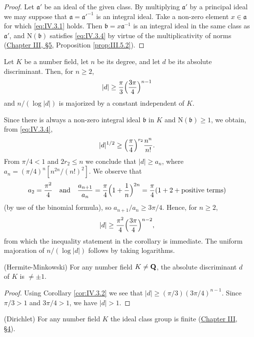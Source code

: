 \begin{proof}
Let $\mathfrak{a}'$ be an ideal of the given class. By multiplying
$\mathfrak{a}'$ by a principal ideal we may suppose that
$\mathfrak{a}=\mathfrak{a}'^{-1}$ is an integral ideal. Take a non-zero
element $x\in\mathfrak{a}$ for which \eqref{eq:IV.3.1} holds. Then
$\mathfrak{b}=x\mathfrak{a}^{-1}$ is an integral ideal in the same class as
$\mathfrak{a}'$, and $\mathrm{N}(\mathfrak{b})$ satisfies \eqref{eq:IV.3.4} by virtue
of the multiplicativity of norms (\hyperref[sec:3.5]{Chapter III, §5}, Proposition
\ref{prop:III.5.2}).
\end{proof}

\begin{corollary}
\label{cor:IV.3.2}
Let $K$ be a number field, let $n$ be its degree, and let $d$ be its
absolute discriminant. Then, for $n\geq2$,
\[
|d|\geq\frac{\pi}{3}\Bigl(\frac{3\pi}{4}\Bigr)^{n-1}
\]
and $n/(\log|d|)$ is majorized by a constant independent of $K$.
\end{corollary}

Since there is always a non-zero integral ideal $\mathfrak{b}$ in $K$ and
$\mathrm{N}(\mathfrak{b})\geq1$, we obtain, from \eqref{eq:IV.3.4},
\[
|d|^{1/2}\geq\Bigl(\frac{\pi}{4}\Bigr)^{r_{2}}\frac{n^{n}}{n!}.
\]
From $\pi/4<1$ and $2r_{2}\leq n$ we conclude that $|d|\geq a_{n}$, where
$a_{n}=(\pi/4)^{n}[n^{2n}/(n!)^{2}]$. We observe that
\[
a_{2}=\frac{\pi^{2}}{4}\quad\text{and}\quad
\frac{a_{n+1}}{a_{n}}=\frac{\pi}{4}\Bigl(1+\frac{1}{n}\Bigr)^{2n}
=\frac{\pi}{4}(1+2+\text{positive terms})
\]
(by use of the binomial formula), so $a_{n+1}/a_{n}\geq3\pi/4$. Hence, for
$n\geq2$,
\[
|d|\geq\frac{\pi^{2}}{4}\Bigl(\frac{3\pi}{4}\Bigr)^{n-2},
\]
from which the inequality statement in the corollary is immediate. The
uniform majoration of $n/(\log|d|)$ follows by taking logarithms.

\begin{theorem}
\label{thm:IV.3.1}
\textnormal{(Hermite-Minkowski)} For any number field $K\neq\mathbf{Q}$, the
absolute discriminant $d$ of $K$ is $\neq\pm1$.
\end{theorem}

\begin{proof}
Using Corollary \ref{cor:IV.3.2} we see that
$|d|\geq(\pi/3)(3\pi/4)^{n-1}$. Since $\pi/3>1$ and $3\pi/4>1$, we have
$|d|>1$.
\end{proof}

\begin{theorem}
\label{thm:IV.3.2}
\textnormal{(Dirichlet)} For any number field $K$ the ideal class group is
finite (\hyperref[sec:3.4]{Chapter III, §4}).
\end{theorem}

